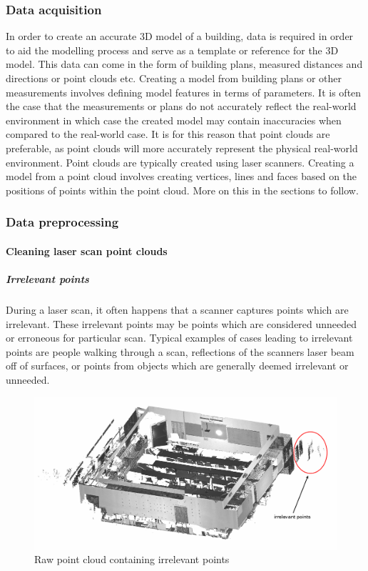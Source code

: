 \documentclass[11pt,a4paper]{report}
\begin{document}
			\subsubsection{Data acquisition}
				In order to create an accurate 3D model of a building, data is required in order to aid the modelling process and serve as a template or reference for the 3D model.
				This data can come in the form of building plans, measured distances and directions or point clouds etc.
				Creating a model from building plans or other measurements involves defining model features in terms of parameters. It is often the case that the measurements or plans do not accurately reflect the real-world environment in which case the created model may contain inaccuracies when compared to the real-world case. It is for this reason that point clouds are preferable, as point clouds will more accurately represent the physical real-world environment.
				Point clouds are typically created using laser scanners.
				Creating a model from a point cloud involves creating vertices, lines and faces based on the positions of points within the point cloud. More on this in the sections to follow.
				
			\subsubsection{Data preprocessing}
				\paragraph{Cleaning laser scan point clouds}
					\subparagraph{Irrelevant points}
						During a laser scan, it often happens that a scanner captures points which are irrelevant. These irrelevant points may be points which are considered unneeded or erroneous for particular scan. Typical examples of cases leading to irrelevant points are people walking through a scan, reflections of the scanners laser beam off of surfaces, or points from objects which are generally deemed irrelevant or unneeded.
						
						\begin{figure}[H]
							\centering
							\includegraphics[width=1\textwidth]{uncleaned_point_cloud}
							\caption[Raw point cloud]{Raw point cloud containing irrelevant points}
							\label{fig:uncleaned_point_cloud}
						\end{figure}
						
\end{document}
